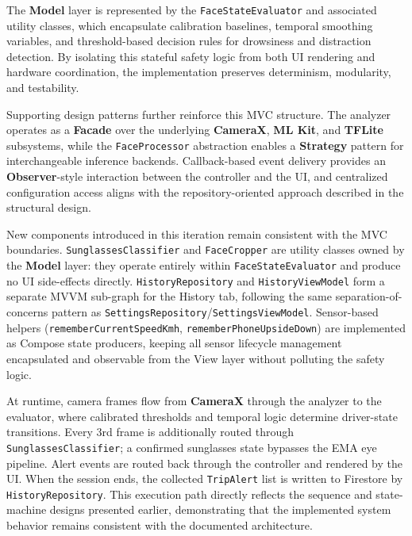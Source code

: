 \documentclass[11pt]{report}
\begin{document}
The \textbf{Model} layer is represented by the \texttt{FaceStateEvaluator} and associated utility classes, which encapsulate calibration baselines, temporal smoothing variables, and threshold-based decision rules for drowsiness and distraction detection. By isolating this stateful safety logic from both UI rendering and hardware coordination, the implementation preserves determinism, modularity, and testability.

Supporting design patterns further reinforce this MVC structure. The analyzer operates as a \textbf{Facade} over the underlying \textbf{CameraX}, \textbf{ML Kit}, and \textbf{TFLite} subsystems, while the \texttt{FaceProcessor} abstraction enables a \textbf{Strategy} pattern for interchangeable inference backends. Callback-based event delivery provides an \textbf{Observer}-style interaction between the controller and the UI, and centralized configuration access aligns with the repository-oriented approach described in the structural design.

New components introduced in this iteration remain consistent with the MVC boundaries. \texttt{SunglassesClassifier} and \texttt{FaceCropper} are utility classes owned by the \textbf{Model} layer: they operate entirely within \texttt{FaceStateEvaluator} and produce no UI side-effects directly. \texttt{HistoryRepository} and \texttt{HistoryViewModel} form a separate MVVM sub-graph for the History tab, following the same separation-of-concerns pattern as \texttt{SettingsRepository}/\texttt{SettingsViewModel}. Sensor-based helpers (\texttt{rememberCurrentSpeedKmh}, \texttt{rememberPhoneUpsideDown}) are implemented as Compose state producers, keeping all sensor lifecycle management encapsulated and observable from the View layer without polluting the safety logic.

At runtime, camera frames flow from \textbf{CameraX} through the analyzer to the evaluator, where calibrated thresholds and temporal logic determine driver-state transitions. Every 3rd frame is additionally routed through \texttt{SunglassesClassifier}; a confirmed sunglasses state bypasses the EMA eye pipeline. Alert events are routed back through the controller and rendered by the UI. When the session ends, the collected \texttt{TripAlert} list is written to Firestore by \texttt{HistoryRepository}. This execution path directly reflects the sequence and state-machine designs presented earlier, demonstrating that the implemented system behavior remains consistent with the documented architecture.
\end{document}
